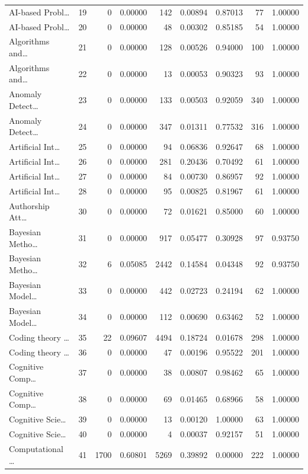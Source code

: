 \begin{table}
\begin{tabular}{lrrrrrrrr}
AI-based Probl… & 19 & 0 & 0.00000 & 142 & 0.00894 & 0.87013 & 77 & 1.00000 \\
AI-based Probl… & 20 & 0 & 0.00000 & 48 & 0.00302 & 0.85185 & 54 & 1.00000 \\
Algorithms and… & 21 & 0 & 0.00000 & 128 & 0.00526 & 0.94000 & 100 & 1.00000 \\
Algorithms and… & 22 & 0 & 0.00000 & 13 & 0.00053 & 0.90323 & 93 & 1.00000 \\
Anomaly Detect… & 23 & 0 & 0.00000 & 133 & 0.00503 & 0.92059 & 340 & 1.00000 \\
Anomaly Detect… & 24 & 0 & 0.00000 & 347 & 0.01311 & 0.77532 & 316 & 1.00000 \\
Artificial Int… & 25 & 0 & 0.00000 & 94 & 0.06836 & 0.92647 & 68 & 1.00000 \\
Artificial Int… & 26 & 0 & 0.00000 & 281 & 0.20436 & 0.70492 & 61 & 1.00000 \\
Artificial Int… & 27 & 0 & 0.00000 & 84 & 0.00730 & 0.86957 & 92 & 1.00000 \\
Artificial Int… & 28 & 0 & 0.00000 & 95 & 0.00825 & 0.81967 & 61 & 1.00000 \\
Authorship Att… & 30 & 0 & 0.00000 & 72 & 0.01621 & 0.85000 & 60 & 1.00000 \\
Bayesian Metho… & 31 & 0 & 0.00000 & 917 & 0.05477 & 0.30928 & 97 & 0.93750 \\
Bayesian Metho… & 32 & 6 & 0.05085 & 2442 & 0.14584 & 0.04348 & 92 & 0.93750 \\
Bayesian Model… & 33 & 0 & 0.00000 & 442 & 0.02723 & 0.24194 & 62 & 1.00000 \\
Bayesian Model… & 34 & 0 & 0.00000 & 112 & 0.00690 & 0.63462 & 52 & 1.00000 \\
Coding theory … & 35 & 22 & 0.09607 & 4494 & 0.18724 & 0.01678 & 298 & 1.00000 \\
Coding theory … & 36 & 0 & 0.00000 & 47 & 0.00196 & 0.95522 & 201 & 1.00000 \\
Cognitive Comp… & 37 & 0 & 0.00000 & 38 & 0.00807 & 0.98462 & 65 & 1.00000 \\
Cognitive Comp… & 38 & 0 & 0.00000 & 69 & 0.01465 & 0.68966 & 58 & 1.00000 \\
Cognitive Scie… & 39 & 0 & 0.00000 & 13 & 0.00120 & 1.00000 & 63 & 1.00000 \\
Cognitive Scie… & 40 & 0 & 0.00000 & 4 & 0.00037 & 0.92157 & 51 & 1.00000 \\
Computational … & 41 & 1700 & 0.60801 & 5269 & 0.39892 & 0.00000 & 222 & 1.00000 \\

\end{tabular}
\end{table}
